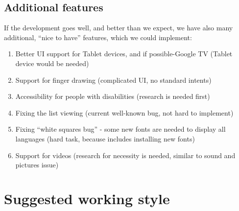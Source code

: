 \documentclass[a4paper,11pt,twoside]{article}
\begin{document}
\subsection{Additional features}

If the development goes well, and better than we expect, we have also many additional, ``nice to have'' features, which
we could implement:
\begin{enumerate}
 \item Better UI support for Tablet devices, and if possible-Google TV (Tablet device would be needed)
 \item Support for finger drawing (complicated UI, no standard intents)
 \item Accessibility for people with disabilities (research is needed first)
 \item Fixing the list viewing (current well-known bug, not hard to implement)
 \item Fixing ``white squares bug'' - some new fonts are needed to display all languages (hard task, because includes installing new fonts)
 \item Support for videos (research for necessity is needed, similar to sound and pictures issue)
\end{enumerate}


\section{Suggested working style}



\pagebreak


\end{document}

